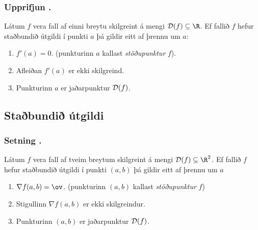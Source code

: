 \subsubsection{Upprifjun \kaflanr.}
   Látum $f$ vera fall af einni breytu
skilgreint á mengi ${\cal D}(f)\subseteq \R$.  Ef fallið $f$ hefur
staðbundið útgildi í punkti $a$ þá gildir eitt af þrennu um $a$:

\begin {enumerate}
 \item $f'(a)=0$. \qquad (punkturinn $a$ kallast {\em \color{red} stöðupunktur} $f$).
 \item Afleiðan $f'(a)$ er ekki skilgreind.
 \item   Punkturinn $a$ er jaðarpunktur ${\cal D}(f)$.
\end {enumerate}






\subsection{Staðbundið útgildi} 

\subsubsection{Setning \kaflanr.}
 Látum $f$ vera fall af tveim breytum
skilgreint á mengi ${\cal D}(f)\subseteq \R^2$.  Ef fallið $f$ hefur
staðbundið útgildi í punkti $(a,b)$ þá gildir eitt af þrennu um $a$
\begin {enumerate}
 \item  $\nabla f(a,b)=\ov$. \qquad (punkturinn $(a,b)$ kallast {\em \color{red}
     stöðupunktur} $f$) 
\item Stigullinn $\nabla f(a,b)$ er ekki skilgreindur.
\item Punkturinn $(a,b)$ er jaðarpunktur ${\cal D}(f)$.
\end {enumerate}





